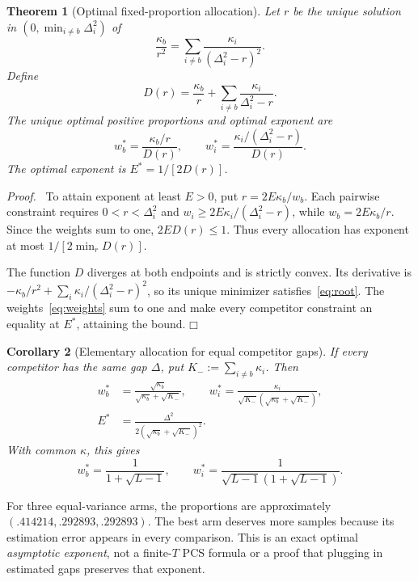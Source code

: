 \documentclass[11pt]{article}
\newtheorem{theorem}{Theorem}
\newtheorem{corollary}[theorem]{Corollary}
\newenvironment{proof}{\par\noindent\textit{Proof.}\ }{\hfill$\mdlgwhtsquare$\par\medskip}
\begin{document}
\begin{theorem}[Optimal fixed-proportion allocation]
Let $r$ be the unique solution in $(0,\min_{i\ne b}\Delta_i^2)$ of
\begin{equation}
\boxed{\frac{\kappa_b}{r^2}
=\sum_{i\ne b}\frac{\kappa_i}{(\Delta_i^2-r)^2}.}
\label{eq:root}
\end{equation}
Define
\begin{equation}
D(r)=\frac{\kappa_b}{r}+\sum_{i\ne b}\frac{\kappa_i}{\Delta_i^2-r}.
\end{equation}
The unique optimal positive proportions and optimal exponent are
\begin{equation}
\boxed{w_b^*=\frac{\kappa_b/r}{D(r)},\qquad
w_i^*=\frac{\kappa_i/(\Delta_i^2-r)}{D(r)}.}
\label{eq:weights}
\end{equation}
The optimal exponent is $E^*=1/[2D(r)]$.
\end{theorem}
\begin{proof}
To attain exponent at least $E>0$, put $r=2E\kappa_b/w_b$. Each pairwise constraint requires $0<r<\Delta_i^2$ and
$w_i\geq2E\kappa_i/(\Delta_i^2-r)$, while $w_b=2E\kappa_b/r$. Since the weights sum to one, $2E D(r)\leq1$. Thus every allocation has exponent at most $1/[2\min_r D(r)]$.

The function $D$ diverges at both endpoints and is strictly convex. Its derivative is $-\kappa_b/r^2+\sum_i\kappa_i/(\Delta_i^2-r)^2$, so its unique minimizer satisfies~\eqref{eq:root}. The weights~\eqref{eq:weights} sum to one and make every competitor constraint an equality at $E^*$, attaining the bound.
\end{proof}

\begin{corollary}[Elementary allocation for equal competitor gaps]
If every competitor has the same gap $\Delta$, put $K_-:=\sum_{i\ne b}\kappa_i$. Then
\begin{align}
w_b^*&=\frac{\sqrt{\kappa_b}}{\sqrt{\kappa_b}+\sqrt{K_-}},\qquad
w_i^*=\frac{\kappa_i}{\sqrt{K_-}(\sqrt{\kappa_b}+\sqrt{K_-})},\\
E^*&=\frac{\Delta^2}{2(\sqrt{\kappa_b}+\sqrt{K_-})^2}.
\end{align}
With common $\kappa$, this gives
\begin{equation}
\boxed{w_b^*=\frac1{1+\sqrt{L-1}},\qquad
w_i^*=\frac1{\sqrt{L-1}(1+\sqrt{L-1})}.}
\end{equation}
\end{corollary}
For three equal-variance arms, the proportions are approximately $(.414214,.292893,.292893)$. The best arm deserves more samples because its estimation error appears in every comparison. This is an exact optimal \emph{asymptotic exponent}, not a finite-$T$ PCS formula or a proof that plugging in estimated gaps preserves that exponent.
\end{document}
